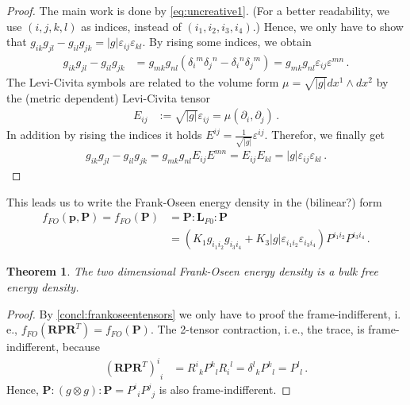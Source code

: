\documentclass{scrartcl}
\newcommand{\germanred}[1]{{\color{red}\selectlanguage{ngerman}#1\selectlanguage{english}}}
\newcommand{\ie}{i.\,e.}%
\newcommand{\formPeriod}{\,\text{.}}
\newcommand{\pb}{\mathbf{p}}%
\newcommand{\Pb}{\mathbf{P}}%
\newcommand{\Lb}{\mathbf{L}}%
\newcommand{\Rb}{\mathbf{R}}
\newcommand{\sftensor}[3]{{{#1}^{#2}}_{#3}}
\newcommand{\fstensor}[3]{{{#1}_{#2}}^{#3}}
\newtheorem{theorem}{Theorem}
\begin{document}
      \begin{proof}
        The main work is done by \eqref{eq:uncreative1}.
        (For a better readability, we use \( (i,j,k,l) \) as indices, instead of \( (i_{1},i_{2},i_{3},i_{4})\).)
        Hence, we only have to show that
        \( g_{ik}g_{jl} - g_{il}g_{jk} = |g|\varepsilon_{ij}\varepsilon_{kl} \).        
        By rising some indices, we obtain
        \begin{align}
          g_{ik}g_{jl} - g_{il}g_{jk}
              &= g_{mk}g_{nl}\left( \fstensor{\delta}{i}{m}\fstensor{\delta}{j}{n}
                                   -\fstensor{\delta}{i}{n}\fstensor{\delta}{j}{m}\right) 
              =  g_{mk}g_{nl}\varepsilon_{ij}\varepsilon^{mn}\formPeriod
        \end{align}
        The Levi-Civita symbols are related to the volume form \( \mu=\sqrt{|g|}dx^{1}\wedge dx^{2} \)
        by the (metric dependent) Levi-Civita tensor
        \begin{align}
          E_{ij} &:= \sqrt{|g|} \varepsilon_{ij} = \mu(\partial_{i},\partial_{j})\formPeriod
        \end{align}
        In addition by rising the indices it holds \(  E^{ij} = \frac{1}{\sqrt{|g|}} \varepsilon^{ij} \).
        Therefor, we finally get
        \begin{align}
          g_{ik}g_{jl} - g_{il}g_{jk}
            = g_{mk}g_{nl}E_{ij}E^{mn}
            = E_{ij}E_{kl} = |g| \varepsilon_{ij}\varepsilon_{kl} \formPeriod
        \end{align}
      \end{proof}
      This leads us to write the Frank-Oseen energy density in the (\germanred{bilinear?}) form
      \begin{align}
        f_{FO}(\pb,\Pb) = f_{FO}(\Pb) &= \Pb:\Lb_{F0}:\Pb \\
            &= \left(K_{1}g_{i_{1}i_{2}}g_{i_{3}i_{4}} + K_{3}|g|\varepsilon_{i_{1}i_{2}}\varepsilon_{i_{3}i_{4}}\right)
               P^{i_{1}i_{2}}P^{i_{3}i_{4}} \formPeriod
      \end{align}
      \begin{theorem}
        The two dimensional Frank-Oseen energy density is a bulk free energy density.
      \end{theorem}
      \begin{proof}
        By \autoref{concl:frankoseentensors} we only have to proof the frame-indifferent,
        \ie, \( f_{FO}(\Rb\Pb\Rb^{T}) = f_{FO}(\Pb) \).
        The 2-tensor contraction, \ie, the trace, is frame-indifferent, because
        \begin{align}
          \sftensor{(\Rb\Pb\Rb^{T})}{i}{i}
            &= \sftensor{R}{i}{k}\sftensor{P}{k}{l}\fstensor{R}{i}{l}
            = \sftensor{\delta}{l}{k}\sftensor{P}{k}{l}
            = \sftensor{P}{l}{l} \formPeriod
        \end{align}
        Hence, \(
          \Pb:( g \otimes g ): \Pb 
              = \sftensor{P}{i}{i}\sftensor{P}{j}{j}
        \)
        is also frame-indifferent.
      \end{proof}
\end{document}
